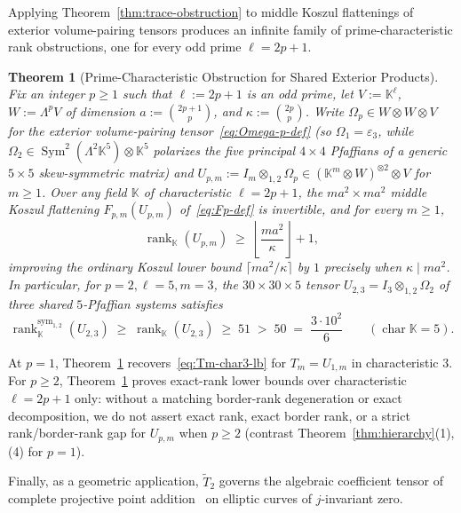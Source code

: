 \documentclass[11pt,reqno]{amsart}
\newtheorem{theorem}{Theorem}[section]
\theoremstyle{definition}
\theoremstyle{remark}
\numberwithin{equation}{section}
\newcommand{\KK}{\mathbb{K}}
\DeclareMathOperator{\rk}{rank}
\DeclareMathOperator{\Sym}{Sym}
\DeclareMathOperator{\chr}{char}
\begin{document}
Applying Theorem~\ref{thm:trace-obstruction} to middle Koszul flattenings of exterior volume-pairing tensors produces an infinite family of prime-characteristic rank obstructions, one for every odd prime $\ell = 2p + 1$.

\begin{theorem}[Prime-Characteristic Obstruction for Shared Exterior Products]\label{thm:exterior-prime}
Fix an integer $p \ge 1$ such that $\ell := 2p + 1$ is an odd prime, let $V := \KK^\ell$, $W := \Lambda^p V$ of dimension $a := \binom{2p+1}{p}$, and $\kappa := \binom{2p}{p}$. Write $\Omega_p \in W \otimes W \otimes V$ for the exterior volume-pairing tensor~\eqref{eq:Omega-p-def} (so $\Omega_1 = \varepsilon_3$, while $\Omega_2 \in \Sym^2(\Lambda^2 \KK^5) \otimes \KK^5$ polarizes the five principal $4 \times 4$ Pfaffians of a generic $5 \times 5$ skew-symmetric matrix) and $U_{p,m} := I_m \otimes_{1,2} \Omega_p \in (\KK^m \otimes W)^{\otimes 2} \otimes V$ for $m \ge 1$. Over any field $\KK$ of characteristic $\ell = 2p + 1$, the $m a^2 \times m a^2$ middle Koszul flattening $F_{p,m}(U_{p,m})$ of~\eqref{eq:Fp-def} is invertible, and for every $m \ge 1$,
\begin{equation}\label{eq:Upm-lb}
  \rk_{\KK}(U_{p,m}) \;\ge\; \left\lfloor \frac{m a^2}{\kappa} \right\rfloor + 1,
\end{equation}
improving the ordinary Koszul lower bound $\lceil m a^2 / \kappa \rceil$ by $1$ precisely when $\kappa \mid m a^2$. In particular, for $p = 2, \ell = 5, m = 3$, the $30 \times 30 \times 5$ tensor $U_{2,3} = I_3 \otimes_{1,2} \Omega_2$ of three shared $5$-Pfaffian systems satisfies
\begin{equation}\label{eq:U23-char5}
  \rk_{\KK}^{\mathrm{sym}_{1,2}}(U_{2,3}) \;\ge\; \rk_{\KK}(U_{2,3}) \;\ge\; 51 \;>\; 50 \;=\; \frac{3 \cdot 10^2}{6} \qquad (\chr\KK = 5).
\end{equation}
\end{theorem}

At $p = 1$, Theorem~\ref{thm:exterior-prime} recovers~\eqref{eq:Tm-char3-lb} for $T_m = U_{1,m}$ in characteristic $3$. For $p \ge 2$, Theorem~\ref{thm:exterior-prime} proves exact-rank lower bounds over characteristic $\ell = 2p + 1$ only: without a matching border-rank degeneration or exact decomposition, we do not assert exact rank, exact border rank, or a strict rank/border-rank gap for $U_{p,m}$ when $p \ge 2$ (contrast Theorem~\ref{thm:hierarchy}(1),(4) for $p = 1$).

Finally, as a geometric application, $\widetilde{T}_2$ governs the algebraic coefficient tensor of complete projective point addition~\cite{BosmaLenstra1995,RCB2016} on elliptic curves of $j$-invariant zero.
\end{document}
